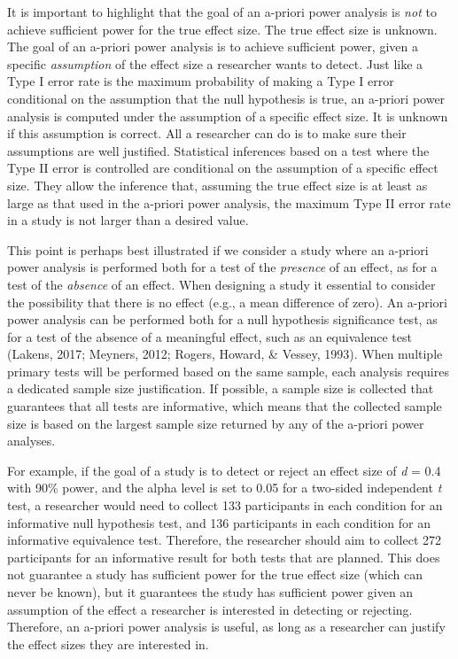 \documentclass[
  english,
  ,jou, a4paper,floatsintext]{apa6}
\begin{document}
It is important to highlight that the goal of an a-priori power analysis is \emph{not} to achieve sufficient power for the true effect size. The true effect size is unknown. The goal of an a-priori power analysis is to achieve sufficient power, given a specific \emph{assumption} of the effect size a researcher wants to detect. Just like a Type I error rate is the maximum probability of making a Type I error conditional on the assumption that the null hypothesis is true, an a-priori power analysis is computed under the assumption of a specific effect size. It is unknown if this assumption is correct. All a researcher can do is to make sure their assumptions are well justified. Statistical inferences based on a test where the Type II error is controlled are conditional on the assumption of a specific effect size. They allow the inference that, assuming the true effect size is at least as large as that used in the a-priori power analysis, the maximum Type II error rate in a study is not larger than a desired value.

This point is perhaps best illustrated if we consider a study where an a-priori power analysis is performed both for a test of the \emph{presence} of an effect, as for a test of the \emph{absence} of an effect. When designing a study it essential to consider the possibility that there is no effect (e.g., a mean difference of zero). An a-priori power analysis can be performed both for a null hypothesis significance test, as for a test of the absence of a meaningful effect, such as an equivalence test (Lakens, 2017; Meyners, 2012; Rogers, Howard, \& Vessey, 1993). When multiple primary tests will be performed based on the same sample, each analysis requires a dedicated sample size justification. If possible, a sample size is collected that guarantees that all tests are informative, which means that the collected sample size is based on the largest sample size returned by any of the a-priori power analyses.

For example, if the goal of a study is to detect or reject an effect size of \emph{d} = 0.4 with 90\% power, and the alpha level is set to 0.05 for a two-sided independent \emph{t} test, a researcher would need to collect 133 participants in each condition for an informative null hypothesis test, and 136 participants in each condition for an informative equivalence test. Therefore, the researcher should aim to collect 272 participants for an informative result for both tests that are planned. This does not guarantee a study has sufficient power for the true effect size (which can never be known), but it guarantees the study has sufficient power given an assumption of the effect a researcher is interested in detecting or rejecting. Therefore, an a-priori power analysis is useful, as long as a researcher can justify the effect sizes they are interested in.
\end{document}
